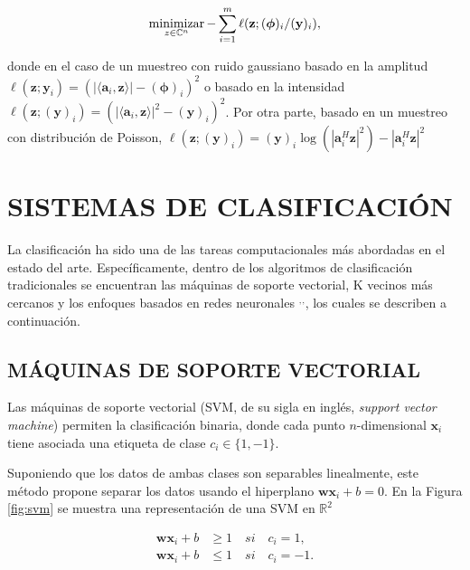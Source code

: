 \begin{itemize}
    \begin{equation}
        \operatorname*{minimizar}_{z \in \mathbb{C}^{n}} -\sum_{i=1}^{m} \ell(\mathbf{z};(\boldsymbol{\phi})_i/(\mathbf{y})_i),
    \end{equation}
    
    donde en el caso de un muestreo con ruido gaussiano basado en la amplitud $\ell(\mathbf{z};\mathbf{y}_i) = (\vert \langle \mathbf{a}_i,\mathbf{z}\rangle \vert - (\boldsymbol{\phi})_i)^2$ o basado en la intensidad  $\ell(\mathbf{z};(\mathbf{y})_i) = (\vert \langle \mathbf{a}_i,\mathbf{z}\rangle \vert^2 - (\mathbf{y})_i)^2$. Por otra parte, basado en un muestreo con distribución de Poisson, $\ell(\mathbf{z};(\mathbf{y})_i) = {(\mathbf{y})_i \log(|\mathbf{a}_i^H \mathbf{z}|^2) -|\mathbf{a}_i^H \mathbf{z}|^2 }$ 
\end{itemize}





\chapter{SISTEMAS DE CLASIFICACIÓN}

La clasificación ha sido una de las tareas computacionales más abordadas en el estado del arte. Específicamente, dentro de los algoritmos de clasificación tradicionales se encuentran las máquinas de soporte vectorial, K vecinos más cercanos  y los enfoques basados en redes neuronales $^,$$^,$, los cuales se describen a continuación.
\section{MÁQUINAS DE SOPORTE VECTORIAL}
Las máquinas de soporte vectorial (SVM, de su sigla en inglés, \textit{support vector machine})  permiten la clasificación binaria, donde cada punto $n$-dimensional $\mathbf{x}_i$ tiene asociada una etiqueta de clase $c_i \in \{1,-1\}$.

Suponiendo que los datos de ambas clases son separables linealmente, este método propone separar los datos usando el hiperplano $\mathbf{w}\mathbf{x}_i + b = 0$. En la Figura \ref{fig:svm} se muestra una representación de una SVM en $\mathbb{R}^2$

\begin{equation}
    \begin{split}
        \mathbf{w}\mathbf{x}_i + b &\geq 1 \quad si \quad c_i=1, \\
        \mathbf{w}\mathbf{x}_i + b &\leq 1 \quad si \quad c_i=-1.
    \end{split}
\end{equation}

